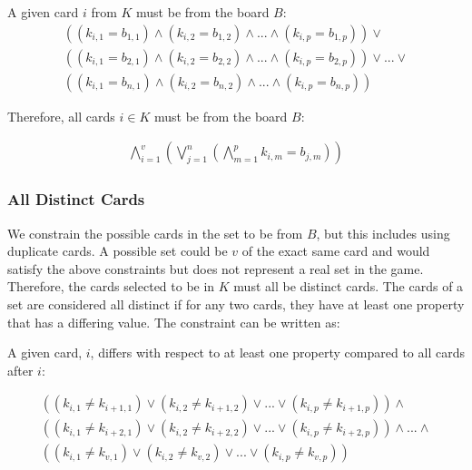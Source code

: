 \documentclass[pageno]{jpaper}
\begin{document}
A given card $i$ from $K$ must be from the board $B$:
\begin{multline}
	((k_{i,1} = b_{1,1}) \wedge (k_{i,2} = b_{1,2}) \wedge ... \wedge (k_{i,p} = b_{1,p})) \vee \\
	 ((k_{i,1} = b_{2,1}) \wedge (k_{i,2} = b_{2,2}) \wedge ... \wedge (k_{i,p} = b_{2,p}))  \vee ... \vee \\ ((k_{i,1} = b_{n,1}) \wedge (k_{i,2} = b_{n,2}) \wedge ... \wedge (k_{i,p} = b_{n,p})) 
\end{multline}

Therefore, all cards $i \in K$ must be from the board $B$:
 
\begin{align}
	\bigwedge \limits_{i=1}^{v}  \left( \bigvee \limits_{j = 1}^{n}  \left( \bigwedge \limits_{m=1}^{p}  k_{i,m} = b_{j,m}\right) \right)
\end{align}

\subsubsection{All Distinct Cards}

We constrain the possible cards in the set to be from $B$, but this includes using duplicate cards. A possible set could be $v$ of the exact same card and would satisfy the above constraints but does not represent a real set in the game. Therefore, the cards selected to be in $K$ must all be distinct cards. The cards of a set are considered all distinct if for any two cards, they have at least one property that has a differing value. The constraint can be written as:



A given card, $i$, differs with respect to at least one property compared to all cards after $i:$

\begin{multline}
	((k_{i,1} \neq k_{i+1,1}) \vee (k_{i,2} \neq k_{i+1,2}) \vee ... \vee (k_{i,p} \neq k_{i+1,p}))  \wedge \\
	((k_{i,1} \neq k_{i+2,1}) \vee (k_{i,2} \neq k_{i+2,2}) \vee ... \vee (k_{i,p} \neq k_{i+2,p}))  \wedge ... \wedge \\ 
	((k_{i,1} \neq k_{v,1}) \vee (k_{i,2} \neq k_{v,2}) \vee ... \vee (k_{i,p} \neq k_{v,p})) 
\end{multline}
\end{document}
